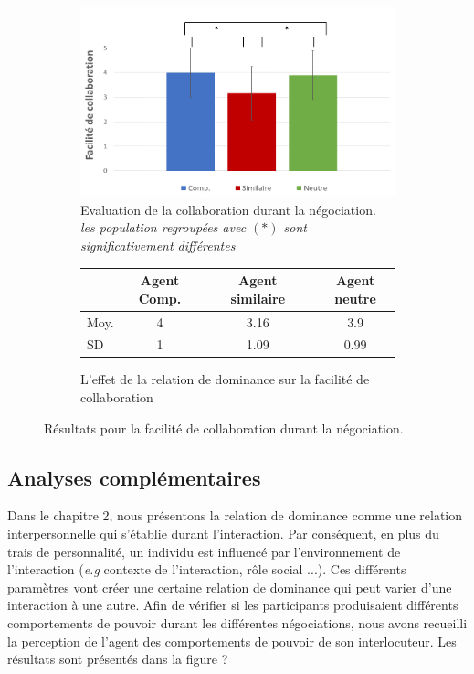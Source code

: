 			\begin{figure}[h]
			
			\begin{subfigure}[h]{0.8\textwidth}
				\centering
				\includegraphics[clip=false]{Figures/chap7/aisee.PNG}
				\caption{ Evaluation de la collaboration durant la négociation. \textit{les population regroupées avec $(*)$ sont significativement différentes }}
			\end{subfigure}
			
			\begin{subfigure}[h]{0.8\textwidth}
				
				\centering
				\begin{tabular}{ l c c c c c }
					\hline
					\textbf{ }& \textbf{Agent Comp.} & &  \textbf{Agent similaire} & & \textbf{Agent neutre} \\ 
					\hline
					\newline Moy. & 4 & & 3.16 & & 3.9 \\
					\newline SD & 1 & & 1.09  & & 0.99   \\
					\hline
					
				\end{tabular}
				\caption{L'effet de la relation de dominance sur la facilité de collaboration} 
			\end{subfigure}
			\caption{Résultats pour la facilité de collaboration durant la négociation.}
			\label{fig:aise}
		\end{figure}
		
			
\subsection{Analyses complémentaires}
	Dans le chapitre 2, nous présentons la relation de dominance comme une relation interpersonnelle qui s'établie durant l'interaction. 
	Par conséquent, en plus du trais de personnalité, un individu est influencé par l'environnement de l'interaction (\textit{e.g} contexte de l'interaction, rôle social ...). Ces différents paramètres vont créer une certaine relation de dominance qui peut varier d'une interaction à une autre.  
	Afin de vérifier si les participants produisaient différents comportements de pouvoir durant les différentes négociations, nous avons recueilli la perception de l'agent des comportements de pouvoir de son interlocuteur.  Les résultats sont présentés dans la figure ?
	
